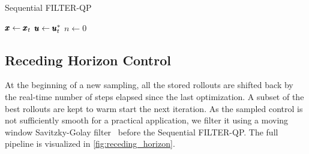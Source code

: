 \begin{algorithm}
\caption{Sequential FILTER-QP \label{algo:sequential_qp}}
$\pmb{x} \gets \pmb{x}_t$\;
$\pmb{u} \gets \pmb{u}^*_t$\;
$n \gets 0$\;
\end{algorithm}

\subsection{Receding Horizon Control} 
At the beginning of a new sampling, all the stored rollouts are shifted back by the real-time number of steps elapsed since the last optimization. A subset of the best rollouts are kept to warm start the next iteration. 
As the sampled control is not sufficiently smooth for a practical application, we filter it using a moving window Savitzky-Golay filter~\cite{gorry1990general} before the Sequential FILTER-QP. The full pipeline is visualized in \fig \ref{fig:receding_horizon}.

